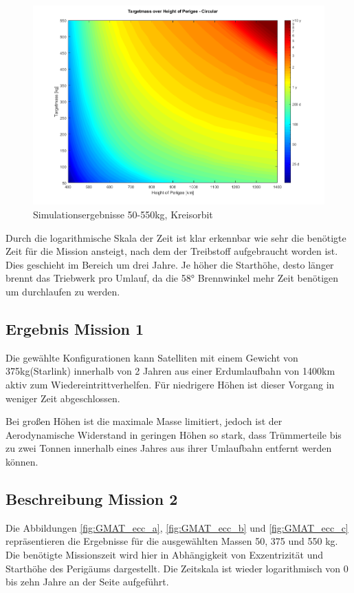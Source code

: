 \begin{figure}[h!]
	\centering
		\includegraphics[width=1.00\textwidth]{./graphics/GMAT/GMAT_Mass_over_Height_550.png}
		\caption{Simulationsergebnisse 50-550kg, Kreisorbit}
	\label{fig:GMAT_Mass_over_Height_550}
\end{figure}


Durch die logarithmische Skala der Zeit ist klar erkennbar wie sehr die benötigte Zeit für die Mission ansteigt, nach dem der Treibstoff aufgebraucht worden ist. Dies geschieht im Bereich um drei Jahre. Je höher die Starthöhe, desto länger brennt das Triebwerk pro Umlauf, da die 58° Brennwinkel mehr Zeit benötigen um durchlaufen zu werden. 

\subsection{Ergebnis Mission 1}
Die gewählte Konfigurationen kann Satelliten mit einem Gewicht von 375kg(Starlink) innerhalb von 2 Jahren aus einer Erdumlaufbahn von 1400km aktiv zum Wiedereintrittverhelfen. Für niedrigere Höhen ist dieser Vorgang in weniger Zeit abgeschlossen. 


Bei großen Höhen ist die maximale Masse limitiert, jedoch ist der Aerodynamische Widerstand in geringen Höhen so stark, dass Trümmerteile bis zu zwei Tonnen innerhalb eines Jahres aus ihrer Umlaufbahn entfernt werden können. 

\subsection{Beschreibung Mission 2}

Die Abbildungen \ref{fig:GMAT_ecc_a}, \ref{fig:GMAT_ecc_b} und \ref{fig:GMAT_ecc_c} repräsentieren die Ergebnisse für die ausgewählten Massen 50, 375 und 550 kg. Die benötigte Missionszeit wird hier in Abhängigkeit von Exzentrizität und Starthöhe des Perigäums dargestellt. Die Zeitskala ist wieder logarithmisch von 0 bis zehn Jahre an der Seite aufgeführt.


